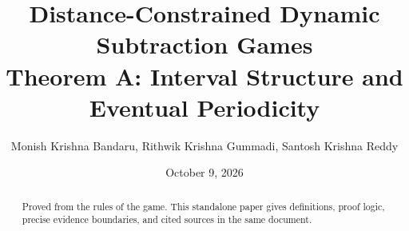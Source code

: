 \documentclass[11pt]{article}
\title{\textbf{Distance-Constrained Dynamic Subtraction Games}\\[0.4em]Theorem A: Interval Structure and Eventual Periodicity}
\author{Monish Krishna Bandaru, Rithwik Krishna Gummadi, Santosh Krishna Reddy}
\date{October 9, 2026}
\begin{document}
\maketitle
\begin{abstract}Proved from the rules of the game. This standalone paper gives definitions, proof logic, precise evidence boundaries, and cited sources in the same document.\end{abstract}
\tableofcontents


\end{document}
